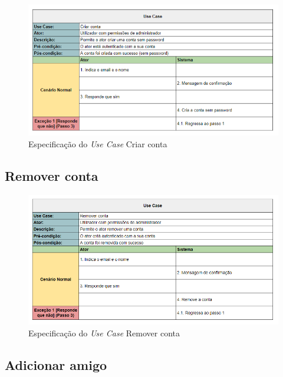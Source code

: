 \documentclass[a4paper]{report}
\begin{document}
\begin{figure}[H]
	\centering 
    \includegraphics[width=\textwidth]{images/Criar_Conta.png}  
    \caption{Especificação do \emph{Use Case} Criar conta}
\end{figure}

\subsection{Remover conta}

\begin{figure}[H]
	\centering 
    \includegraphics[width=\textwidth]{images/Remover_Conta.png}  
    \caption{Especificação do \emph{Use Case} Remover conta}
\end{figure}

\subsection{Adicionar amigo}
\end{document}
